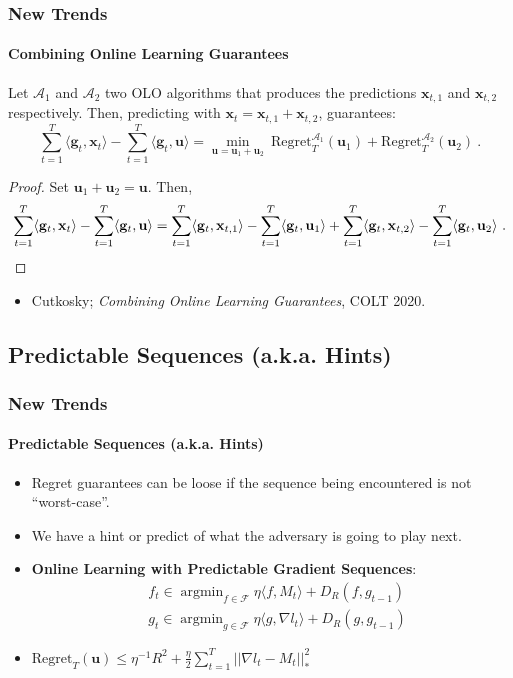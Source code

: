 \documentclass{beamer}
\DeclareMathOperator*{\argmin}{argmin}
\newcommand{\uu}{\mathbf{u}}
\newcommand{\x}{\mathbf{x}}
\begin{document}
\begin{frame}
\frametitle{New Trends}
\framesubtitle{Combining Online Learning Guarantees}

\begin{theorem}
{\scriptsize Let $\mathcal{A}_1$ and $\mathcal{A}_2$ two OLO algorithms that produces the predictions $\x_{t,1}$ and $\x_{t,2}$ respectively.
Then, predicting with $\x_t=\x_{t,1}+\x_{t,2}$, guarantees:
\[
\sum_{t=1}^T \langle \mathbf{g}_t, \x_t\rangle - \sum_{t=1}^T \langle \mathbf{g}_t, \uu\rangle
= \min_{\uu=\uu_1+\uu_2} \ \mathrm{Regret}^{\mathcal{A}_1}_T(\uu_1) + \mathrm{Regret}^{\mathcal{A}_2}_T(\uu_2)~.
\]}
\end{theorem}
\begin{small}
\begin{proof}
Set $\uu_1+\uu_2=\uu$. Then,
{\scriptsize
\[
\sum_{t=1}^T \langle \mathbf{g}_t, \x_t\rangle - \sum_{t=1}^T \langle \mathbf{g}_t, \uu\rangle
=\sum_{t=1}^T \langle \mathbf{g}_t, \x_{t,1}\rangle - \sum_{t=1}^T \langle \mathbf{g}_t, \uu_1\rangle 
+\sum_{t=1}^T \langle \mathbf{g}_t, \x_{t,2}\rangle - \sum_{t=1}^T \langle \mathbf{g}_t, \uu_2\rangle~. \qedhere
\]}
\end{proof}
\vspace{-0.3cm}
\begin{itemize}
\item Cutkosky; \textit{Combining Online Learning Guarantees}, COLT 2020.
\end{itemize}

\end{small}
\end{frame}

\subsection{Predictable Sequences (a.k.a. Hints)}
\frame{\subsectionpage}

\begin{frame}
\frametitle{New Trends}
\framesubtitle{Predictable Sequences (a.k.a. Hints)}

\begin{itemize}
\item Regret guarantees can be loose if the sequence being encountered is not “worst-case”.

\item We have a hint or predict of what the adversary is going to play next.

\pause
\item \textbf{Online Learning with Predictable Gradient Sequences}:
\vspace{-0.2cm}
\begin{align*}
&	f_t \in \argmin_{f\in\mathcal{F}} \eta \langle f, M_t \rangle + D_R(f, g_{t-1})\\
&   g_t \in \argmin_{g\in\mathcal{F}} \eta \langle g, \nabla l_t \rangle + D_R(g, g_{t-1})
\end{align*}

\item $\mathrm{Regret}_T(\uu) \leq \eta^{-1}R^2 + \frac{\eta}{2} \sum_{t = 1}^{T}||\nabla l_t - M_t||_*^2$
\end{itemize}

\end{frame}
\end{document}
